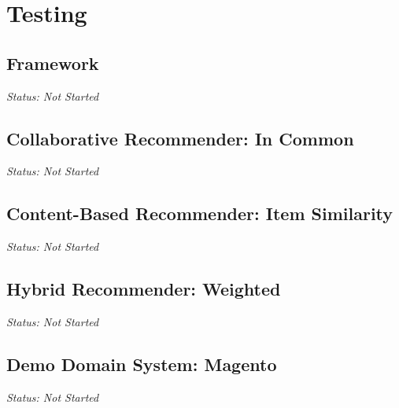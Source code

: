 \chapter{Testing}

\section{Framework}

\emph{Status: Not Started}

\section{Collaborative Recommender: In Common}

\emph{Status: Not Started}

\section{Content-Based Recommender: Item Similarity}

\emph{Status: Not Started}

\section{Hybrid Recommender: Weighted}

\emph{Status: Not Started}

\section{Demo Domain System: Magento}

\emph{Status: Not Started}
